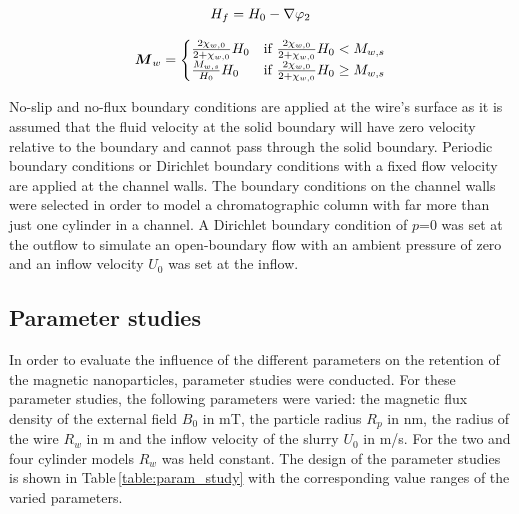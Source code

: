 \begin{equation}
\label{eq:loc_mag_field}
\centering
H_{f}=H_{0}-\nabla\varphi_{2}
\end{equation}

\begin{equation}
\label{eq:mag_wire}
\centering
\boldsymbol{M}_{w}= 
                 \begin{cases}
                    \frac{2\chi_{w,0}}{2+\chi_{w,0}}H_{0} & \text{if}\ \frac{2\chi_{w,0}}{2+\chi_{w,0}}H_{0}<M_{w,s} \\
                    \frac{M_{w,s}}{H_{0}}H_{0} & \text{if}\ \frac{2\chi_{w,0}}{2+\chi_{w,0}}H_{0}\geq M_{w,s} \\
                 \end{cases}
\end{equation}

No-slip and no-flux boundary conditions are applied at the wire's surface as it is assumed that the fluid velocity at the solid boundary will have zero velocity relative to the boundary and cannot pass through the solid boundary. Periodic boundary conditions or Dirichlet boundary conditions with a fixed flow velocity are applied at the channel walls. The boundary conditions on the channel walls were selected in order to model a chromatographic column with far more than just one cylinder in a channel. A Dirichlet boundary condition of $p$=0 was set at the outflow to simulate an open-boundary flow with an ambient pressure of zero and an inflow velocity $U_{0}$ was set at the inflow.


\subsection{Parameter studies}
\label{subsec:Param_studies} 
In order to evaluate the influence of the different parameters on the retention of the magnetic nanoparticles, parameter studies were conducted. For these parameter studies, the following parameters were varied: the magnetic flux density of the external field $B_{0}$ in mT, the particle radius $R_{p}$ in nm, the radius of the wire $R_{w}$ in \textmu m and the inflow velocity of the slurry $U_{0}$ in \textmu m/s. For the two and four cylinder models $R_{w}$ was held constant. The design of the parameter studies is shown in Table\,\ref{table:param_study} with the corresponding value ranges of the varied parameters. 

